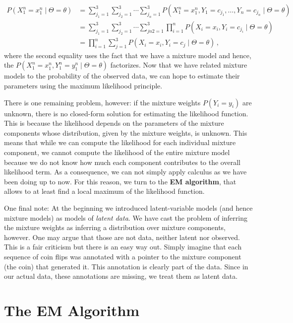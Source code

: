 \documentclass[a4paper,11pt,leqno]{report}\usepackage[]{graphicx}\usepackage[]{color}
\begin{document}
\begin{align}
P(X_1^n=x_{1}^{n} \mid \Theta= \theta) &= \sum_{j_1=1}^3 \sum_{j_2=1}^3 \cdots \sum_{j_n=1}^3 P(X_1^n=x_{1}^{n}, Y_1=c_{j_1}, \ldots, Y_n=c_{j_n} \mid \Theta= \theta) \label{eq:marginal} \\
&= \sum_{j_1=1}^3 \sum_{j_2=1}^3 \cdots \sum_{jn2=1}^3 \prod_{i=1}^{n} P(X_{i}=x_{i},Y_{i}=c_{j_i} \mid  \Theta= \theta) \nonumber \\
&= \prod_{i=1}^{n} \sum_{j=1}^3 P(X_{i}=x_{i},Y_{i}=c_{j} \mid  \Theta= \theta) \, , \nonumber
\end{align}
where the second equality uses the fact that we have a mixture model and hence, the $P(X_1^n=x_1^n, Y_1^n=y_1^n \mid \Theta = \theta)$ factorizes.
Now that we have related mixture models to the probability of the observed data, we can hope to estimate
their parameters using the maximum likelihood principle.

There is one remaining problem, however: if the mixture weights $P(Y_i=y_i)$ are unknown, there is no closed-form solution for estimating the likelihood function. This is because
the likelihood depends on the parameters of the mixture components whose distribution, given
by the mixture weights, is unknown. This means that while we can compute the likelihood for each
individual mixture component, we cannot compute the likelihood of the entire mixture model because we
do not know how much each component contributes to the overall likelihood term. As a consequence, we can not 
simply apply calculus as we have been doing up to now. For this reason, we turn to the \textbf{EM algorithm}, 
that allows to at least find a local maximum of the likelihood function.

One final note: At the beginning we introduced latent-variable models (and hence mixture models) as models
of \textit{latent data}. We have cast the problem of inferring the mixture weights as inferring a 
distribution over mixture components, however. One may argue that those are not data, neither latent nor 
observed. This is a fair criticism but there is an easy way out. Simply imagine that each sequence of coin
flips was annotated with a pointer to the mixture component (the coin) that generated it. This annotation
is clearly part of the data. Since in our actual data, these annotations are missing, we treat them as 
latent data.

\section{The EM Algorithm}
\end{document}
